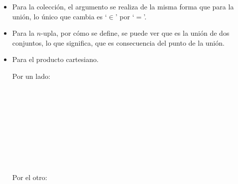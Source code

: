 \begin{demo}
\begin{enumerate}
\begin{itemize}
            \item Para la colección, el argumento se realiza de la
                  misma forma que para la unión, lo único que cambia es
                  `$\in$' por `$=$'.
            \item Para la $n$-upla, por cómo se define, se puede ver que es
                  la unión de dos conjuntos, lo que significa, que es
                  consecuencia del punto de la unión.
            \item Para el producto cartesiano.

                  Por un lado:
                  \begin{longderivation}
                      \\
                    \equiv\\
                      \\
                    \equiv\\
                      \\
                    \\
                      \\
                    \equiv\\
                  \end{longderivation}
                  Por el otro:
                  \begin{longderivation}
                      \\
                    \equiv\\
                      \\
                    \\
\end{longderivation}
\end{itemize}
\end{enumerate}
\end{demo}
